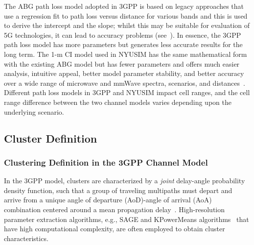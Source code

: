 \documentclass[journal]{IEEEtran}
\begin{document}
The ABG path loss model adopted in 3GPP is based on legacy approaches that use a regression fit to path loss versus distance for various bands and this is used to derive the intercept and the slope; whilst this may be suitable for evaluation of 5G technologies, it can lead to accuracy problems (see~\cite{Sun16:TVT}). In essence, the 3GPP path loss model has more parameters but generates less accurate results for the long term. The 1-m CI model used in NYUSIM has the same mathematical form with the existing ABG model but has fewer parameters and offers much easier analysis, intuitive appeal, better model parameter stability, and better accuracy over a wide range of microwave and mmWave spectra, scenarios, and distances~\cite{Sun16:TVT}. Different path loss models in 3GPP and NYUSIM impact cell ranges, and the cell range difference between the two channel models varies depending upon the underlying scenario. 

\vspace{-5.4pt}

\subsection{Cluster Definition}
\subsubsection{Clustering Definition in the 3GPP Channel Model}
In the 3GPP model, clusters are characterized by a \textit{joint} delay-angle probability density function, such that a group of traveling multipaths must depart and arrive from a unique angle of departure (AoD)-angle of arrival (AoA) combination centered around a mean propagation delay~\cite{Samimi15:MTT,3GPP_Dec}. High-resolution parameter extraction algorithms, e.g., SAGE and KPowerMeans algorithms~\cite{Fleury99,Czink06} that have high computational complexity, are often employed to obtain cluster characteristics. 
\end{document}
